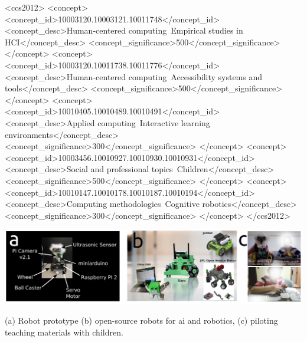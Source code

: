 \documentclass[sigconf]{acmart}
\begin{document}
\begin{CCSXML}
<ccs2012>
     <concept>
         <concept_id>10003120.10003121.10011748</concept_id>
         <concept_desc>Human-centered computing~Empirical studies in HCI</concept_desc>
         <concept_significance>500</concept_significance>
         </concept>
     <concept>
         <concept_id>10003120.10011738.10011776</concept_id>
         <concept_desc>Human-centered computing~Accessibility systems and tools</concept_desc>
         <concept_significance>500</concept_significance>
         </concept>
     <concept>
         <concept_id>10010405.10010489.10010491</concept_id>
         <concept_desc>Applied computing~Interactive learning environments</concept_desc>
         <concept_significance>300</concept_significance>
         </concept>
     <concept>
         <concept_id>10003456.10010927.10010930.10010931</concept_id>
         <concept_desc>Social and professional topics~Children</concept_desc>
         <concept_significance>500</concept_significance>
         </concept>
     <concept>
         <concept_id>10010147.10010178.10010187.10010194</concept_id>
         <concept_desc>Computing methodologies~Cognitive robotics</concept_desc>
         <concept_significance>300</concept_significance>
         </concept>
</ccs2012>
\end{CCSXML}



\begin{teaserfigure}
  \includegraphics[width=\textwidth]{../figures/air4children/versions/drawing-v01.png}
  \caption{(a) Robot prototype (b) open-source robots for ai and robotics, (c) piloting teaching materials with children.}
  \label{fig:teaser}
\end{teaserfigure}
\end{document}
